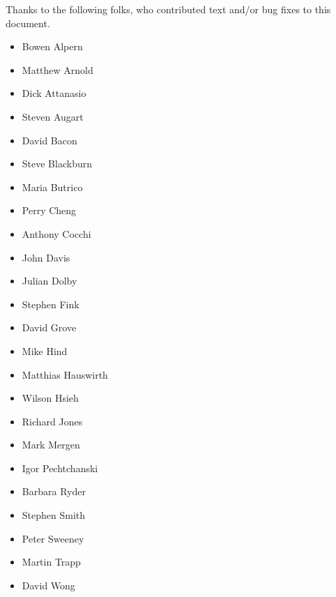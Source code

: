 Thanks to the following folks, who contributed text and/or bug fixes to
this document.

\begin{itemize}
\item Bowen Alpern
\item Matthew Arnold
\item Dick Attanasio
\item Steven Augart
\item David Bacon
\item Steve Blackburn
\item Maria Butrico
\item Perry Cheng
\item Anthony Cocchi
\item John Davis
\item Julian Dolby
\item Stephen Fink
\item David Grove
\item Mike Hind
\item Matthias Hauswirth
\item Wilson Hsieh
\item Richard Jones
\item Mark Mergen
\item Igor Pechtchanski
\item Barbara Ryder
\item Stephen Smith
\item Peter Sweeney
\item Martin Trapp
\item David Wong
\end{itemize}
